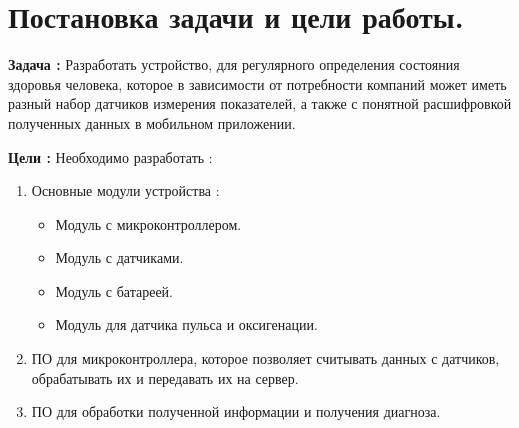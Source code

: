 \documentclass[a4document]{article}
\begin{document}
{
\newpage
\section*{Постановка задачи и цели работы.} 

\par\noindent
\textbf{Задача :}
\newline
Разработать устройство, для регулярного определения состояния здоровья человека, 
которое в зависимости от потребности компаний может иметь разный набор датчиков измерения показателей,
а также с понятной расшифровкой полученных данных в мобильном приложении. 

\bigbreak
\par\noindent
\textbf{Цели :}
\newline
Необходимо разработать : 
\begin{enumerate}
    \item Основные модули устройства : 
    \begin{itemize}
        \item Модуль с микроконтроллером.
        \item Модуль с датчиками. 
        \item Модуль с батареей.
        \item Модуль для датчика пульса и оксигенации.
    \end{itemize}
    \item ПО для микроконтроллера, которое позволяет считывать данных с датчиков, обрабатывать их и передавать их на сервер.
    \item ПО для обработки полученной информации и получения диагноза.
\end{enumerate}

}
\end{document}

